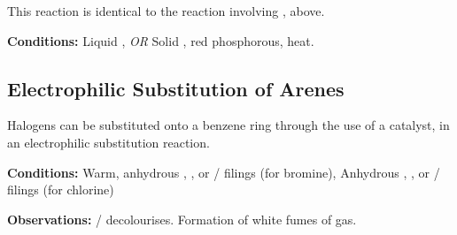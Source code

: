				This reaction is identical to the reaction involving , above.

				\vspace{1.5em}
				\vbox{\textbf{Conditions:}	\tabto{35mm}Liquid , \textit{OR}
											\tabto{35mm}Solid , {\color{Red}red} phosphorous, heat.}





		\subsection{Electrophilic Substitution of Arenes}

			Halogens can be substituted onto a benzene ring through the use of a catalyst, in an electrophilic substitution reaction.

			\vspace{1.5em}
			\vbox{\textbf{Conditions:}	\tabto{35mm}Warm, anhydrous , , or  /
										\ch{\Al} filings (for bromine),
										\tabto{35mm}Anhydrous , , or
													 / \ch{\Al} filings (for chlorine)}

			\vspace{0.75em}
			\vbox{\textbf{Observations:}\tabto{35mm}  /
										  decolourises.
										\tabto{35mm}Formation of white fumes of  gas.}


